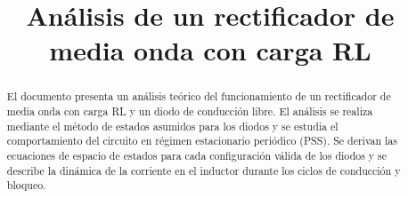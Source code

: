 \documentclass[conference]{IEEEtran}
\begin{document}
%
\title{Análisis de un rectificador de media onda con carga RL}

\author{
\and
{}
\and
{}
\and
{}
}


\maketitle

\thispagestyle{firststyle}
\renewcommand{\headrulewidth}{0in}
\pagestyle{empty}


\pagestyle{fancy}
\chead{\fontsize{8}{10} \selectfont \textit{} }



\begin{abstract}
El documento presenta un análisis teórico del funcionamiento de un rectificador de media onda con carga RL y un diodo de conducción libre. El análisis se realiza mediante el método de estados asumidos para los diodos y se estudia el comportamiento del circuito en régimen estacionario periódico (PSS). Se derivan las ecuaciones de espacio de estados para cada configuración válida de los diodos y se describe la dinámica de la corriente en el inductor durante los ciclos de conducción y bloqueo.
\end{abstract}
\end{document}
